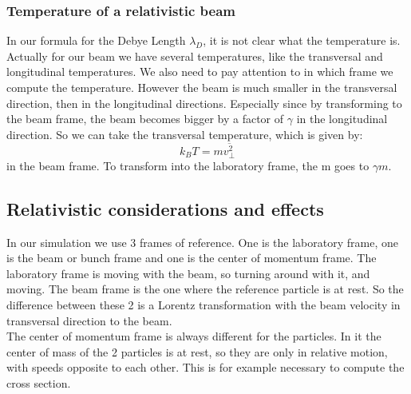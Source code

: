 \subsubsection{Temperature of a relativistic beam}
In our formula for the Debye Length $\lambda_D$, it is not clear what the temperature is. Actually for our beam we have several temperatures, like the transversal and longitudinal temperatures. We also need to pay attention to in which frame we compute the temperature. However the beam is much smaller in the transversal direction, then in the longitudinal directions. Especially since by transforming to the beam frame, the beam becomes bigger by a factor of $\gamma$ in the longitudinal direction. So we can take the transversal temperature, which is given by:
\begin{equation} k_B T = m \overline{v_\perp ^2} \end{equation}
in the beam frame. To transform into the laboratory frame, the m goes to $\gamma m$.

\subsection{Relativistic considerations and effects}
In our simulation we use 3 frames of reference. One is the laboratory frame, one is the beam or bunch frame and one is the center of momentum frame. The laboratory frame is moving with the beam, so turning around with it, and moving. The beam frame is the one where the reference particle is at rest. So the difference between these 2 is a Lorentz transformation with the beam velocity in transversal direction to the beam.\\
The center of momentum frame is always different for the particles. In it the center of mass of the 2 particles is at rest, so they are only in relative motion, with speeds opposite to each other. This is for example necessary to compute the cross section.


